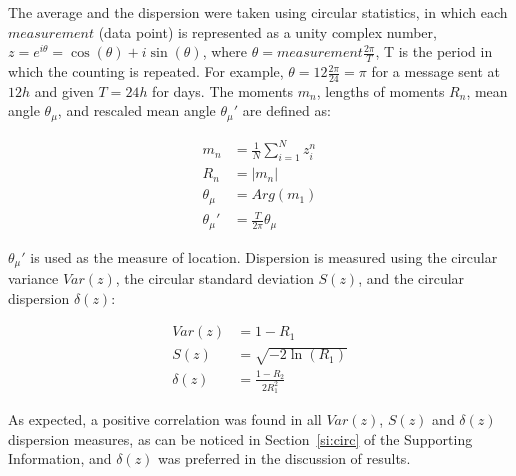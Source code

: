 \documentclass[%
	aip,
	jmp,%
	amsmath,amssymb,
	reprint,%
]{revtex4-1}
\begin{document}
The average and the dispersion were taken using circular statistics, in which each $measurement$ (data point) is represented as a unity complex number, $z=e^{i\theta}=\cos(\theta)+i\sin(\theta)$, where $\theta=measurement\frac{2\pi}{T}$, T is the period in which the counting is repeated. For example, $\theta=12\frac{2\pi}{24}=\pi$ for a message sent at $12h$ and given $T=24h$ for days. The moments $m_n$, lengths of moments $R_n$, mean angle $\theta_\mu$, and rescaled mean angle $\theta_\mu'$ are defined as:

\begin{align}\label{eq:cmom}
	m_n&=\frac{1}{N}\sum_{i=1}^N z_i^n \nonumber\\
	R_n&=|m_n|\\
	\theta_\mu&=Arg(m_1) \nonumber \\
	\theta_\mu'&=\frac{T}{2\pi} \theta_\mu \nonumber
\end{align}

$\theta_\mu'$ is used as the measure of location. Dispersion is measured using the circular variance $Var(z)$, the circular standard deviation $S(z)$, and the circular dispersion $\delta(z)$:

\begin{align}\label{eq:cmd}
	Var(z)&=1 - R_1 \nonumber\\
	S(z)&= \sqrt{-2\ln(R_1)}\\
	\delta(z)&=\frac{1-R_2}{2 R_1^2} \nonumber
\end{align}

\noindent As expected, a positive correlation was found in all $Var(z)$, $S(z)$ and $\delta(z)$ dispersion measures, as can be noticed in Section~\ref{si:circ} of the Supporting Information, and $\delta(z)$ was preferred in the discussion of results.
\end{document}
